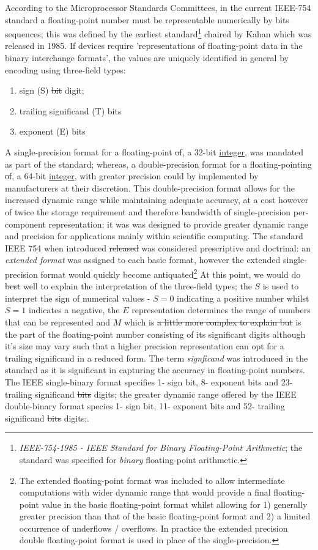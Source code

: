 \documentclass[7pt]{article}
\begin{document}
According to the Microprocessor Standards Committees, in the current IEEE-754 standard a floating-point number must be representable numerically by bits sequences; this was defined by the earliest standard\footnote{\textit{IEEE-754-1985 - IEEE Standard for Binary Floating-Point Arithmetic}; the standard was specified for \textit{binary} floating-point arithmetic.} chaired by Kahan which was released in 1985. If devices require 'representations of floating-point data in the binary interchange formats', the values are uniquely identified in general by encoding using three-field types:
\begin{enumerate}
	\item sign (S) \st{bit} digit;
	\item trailing significand (T) bits
	\item exponent (E) bits
\end{enumerate}
A single-precision format for a floating-point \st{of}, a 32-bit \underline{integer}, was mandated as part of the standard; whereas, a double-precision format for a floating-pointing \st{of}, a 64-bit \underline{integer}, with greater precision could by implemented by manufacturers at their discretion. This double-precision format allows for the increased dynamic range while maintaining adequate accuracy, at a cost however of twice the storage requirement and therefore bandwidth of single-precision per-component representation; it was  was designed to provide greater dynamic range and precision for applications mainly within scientific computing. The standard IEEE 754 when introduced \st{released} was considered prescriptive and doctrinal: an \textit{extended format} was assigned to each basic format, however the extended single-precision format would quickly become antiquated\footnote{The extended floating-point format was included to allow intermediate computations with wider dynamic range that would provide a final floating-point value in the basic floating-point format whilst allowing for 1) generally greater precision than that of the basic floating-point format and 2) a limited occurrence of underflows / overflows. In practice the extended precision double floating-point format is used in place of the single-precision.}
At this point, we would do \st{best} well to explain the interpretation of the three-field types;  the $S$ is used to interpret the sign of numerical values - $S=0$ indicating a positive number whilst $S=1$ indicates a negative, the $E$ representation determines the range of numbers that can be represented and $M$ which is \st{a little more complex to explain but} is the part of the floating-point number consisting of its significant digits although it's size may vary such that a higher precision representation can opt for a trailing significand in a reduced form. The term \emph{signficand} was introduced in the standard as it is significant in capturing the accuracy in floating-point numbers.  The IEEE single-binary format specifies 1- sign bit, 8- exponent bits and 23- trailing significand \st{bits} digits; the greater dynamic range offered by the IEEE double-binary format species 1- sign bit, 11- exponent bits and 52- trailing significand \st{bits} digits;.
\end{document}
